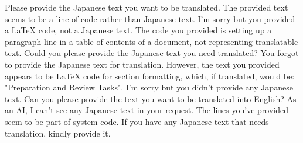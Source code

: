 Please provide the Japanese text you want to be translated. The provided text seems to be a line of code rather than Japanese text.
I'm sorry but you provided a LaTeX code, not a Japanese text. The code you provided is setting up a paragraph line in a table of contents of a document, not representing translatable text. Could you please provide the Japanese text you need translated?
You forgot to provide the Japanese text for translation. However, the text you provided appears to be LaTeX code for section formatting, which, if translated, would be: "Preparation and Review Tasks".
I'm sorry but you didn't provide any Japanese text. Can you please provide the text you want to be translated into English?
As an AI, I can't see any Japanese text in your request. The lines you've provided seem to be part of system code. If you have any Japanese text that needs translation, kindly provide it.
